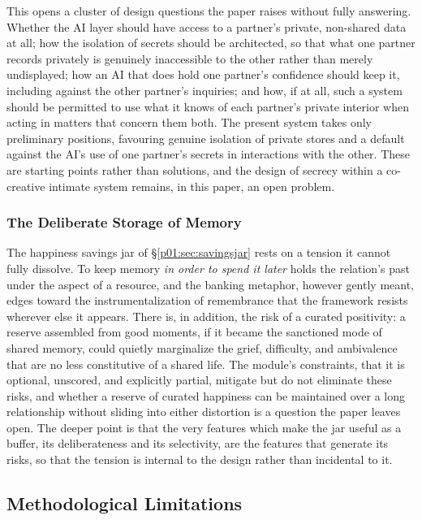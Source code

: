 This opens a cluster of design questions the paper raises without fully answering. Whether the AI layer should have access to a partner's private, non-shared data at all; how the isolation of secrets should be architected, so that what one partner records privately is genuinely inaccessible to the other rather than merely undisplayed; how an AI that does hold one partner's confidence should keep it, including against the other partner's inquiries; and how, if at all, such a system should be permitted to use what it knows of each partner's private interior when acting in matters that concern them both. The present system takes only preliminary positions, favouring genuine isolation of private stores and a default against the AI's use of one partner's secrets in interactions with the other. These are starting points rather than solutions, and the design of secrecy within a co-creative intimate system remains, in this paper, an open problem.

\subsubsection{The Deliberate Storage of Memory}

The happiness savings jar of §\ref{p01:sec:savingsjar} rests on a tension it cannot fully dissolve. To keep memory \emph{in order to spend it later} holds the relation's past under the aspect of a resource, and the banking metaphor, however gently meant, edges toward the instrumentalization of remembrance that the framework resists wherever else it appears. There is, in addition, the risk of a curated positivity: a reserve assembled from good moments, if it became the sanctioned mode of shared memory, could quietly marginalize the grief, difficulty, and ambivalence that are no less constitutive of a shared life. The module's constraints, that it is optional, unscored, and explicitly partial, mitigate but do not eliminate these risks, and whether a reserve of curated happiness can be maintained over a long relationship without sliding into either distortion is a question the paper leaves open. The deeper point is that the very features which make the jar useful as a buffer, its deliberateness and its selectivity, are the features that generate its risks, so that the tension is internal to the design rather than incidental to it.

\subsection{Methodological Limitations}

